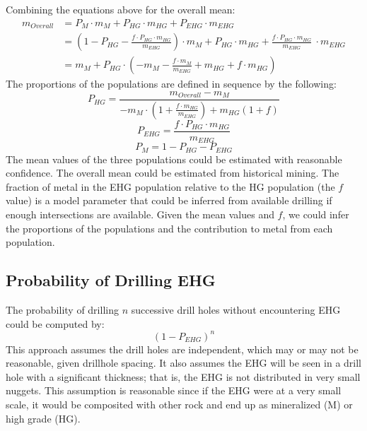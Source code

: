 Combining the equations above for the overall mean:
\begin{align}
    m_{Overall} & = P_{M} \cdot m_{M}  + P_{HG} \cdot m_{HG} + P_{EHG} \cdot m_{EHG} \nonumber                                                                                                  \\
                & = \left(1-P_{HG}-\frac{f \cdot P_{HG} \cdot m_{HG}}{m_{EHG}}\right) \cdot m_{M} + P_{HG} \cdot m_{HG} + \frac{f \cdot P_{HG} \cdot m_{HG}}{m_{EHG}} \ \cdot m_{EHG} \nonumber \\
                & = m_{M} + P_{HG} \cdot \left( -m_{M}-\frac{f \cdot m_{M}}{m_{EHG}}  + m_{HG} + f \cdot m_{HG} \right) \nonumber
\end{align}
The proportions of the populations are defined in sequence by the following:
\[
    P_{HG} =
    \frac{m_{Overall} - m_M}
    {
        -m_M \cdot \left( 1+\frac{f \cdot m_{HG}}{m_{EHG}}\right) + m_{HG}(1+f)
    }
\]
\[
    P_{EHG} = \frac{f \cdot P_{HG} \cdot m_{HG}}{m_{EHG}}
\]
\[
    P_{M} = 1 - P_{HG} - P_{EHG}
\]
The mean values of the three populations could be estimated with reasonable confidence. The overall mean could be estimated from historical mining. The fraction of metal in the \gls{EHG} population relative to the \gls{HG} population (the $f$ value) is a model parameter that could be inferred from available drilling if enough intersections are available. Given the mean values and $f$, we could infer the proportions of the populations and the contribution to metal from each population.

\subsection{Probability of Drilling EHG}
\label{subsec:02probehg}

The probability of drilling $n$ successive drill holes without encountering \gls{EHG} could be computed by:
\[
    \left( 1 - P_{EHG} \right)^n
\]
This approach assumes the drill holes are independent, which may or may not be reasonable, given drillhole spacing. It also assumes the \gls{EHG} will be seen in a drill hole with a significant thickness; that is, the \gls{EHG} is not distributed in very small nuggets. This assumption is reasonable since if the \gls{EHG} were at a very small scale, it would be composited with other rock and end up as mineralized (M) or high grade (HG).

